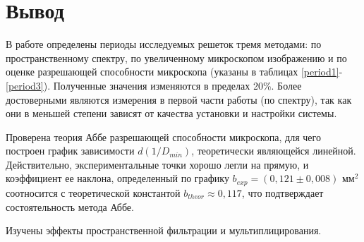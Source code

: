 \documentclass[12pt]{kiarticle}
\begin{document}
\section{Вывод} 

В работе определены периоды исследуемых решеток тремя методами: по пространственному спектру, по увеличенному микроскопом изображению и по оценке разрешающей способности микроскопа (указаны в таблицах \ref{period1}-\ref{period3}). Полученные значения изменяются в пределах 20\%. Более достоверными являются измерения в первой части работы (по спектру), так как они в меньшей степени зависят от качества установки и настройки системы. 

Проверена теория Аббе разрешающей способности микроскопа, для чего построен график зависимости $d(1/D_{min})$, теоретически являющейся линейной. Действительно, экспериментальные точки хорошо легли на прямую, и коэффициент ее наклона, определенный по графику $b_{exp} = (0,121 \pm 0,008) \text{ мм}^2$ соотносится с теоретической константой $b_{theor} \approx 0,117$, что подтверждает состоятельность метода Аббе.

Изучены эффекты пространственной фильтрации и мультиплицирования.  
	
\end{document}

